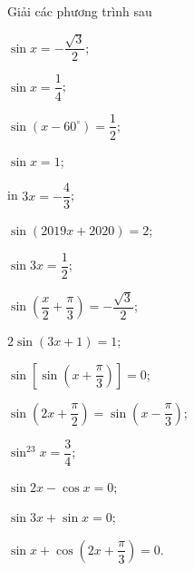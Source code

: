 \begin{ex}%
	Giải  các phương trình sau
	\begin{listEX}[3]
		 \item $\sin x=-\dfrac{\sqrt{3}}{2}$;
		\item  $\sin x=\dfrac{1}{4}$;
		\item $\sin \left(x-60^\circ\right)=\dfrac{1}{2}$; 
		\item  $\sin x=1$;
		\item in  $3x=-\dfrac{4}{3}$;
		\item $\sin  (2019x+2020)=2$;
		\item  $\sin 3x=\dfrac{1}{2}$;
		\item $\sin  \left(\dfrac{x}{2}+\dfrac{\pi}{3}\right)=-\dfrac{\sqrt{3}}{2}$;
		 \item $2\sin (3x+1)=1$;
		\item  $\sin \left[\sin \left(x+\dfrac{\pi}{3}\right)\right]=0$;
		\item $\sin  \left(2x+\dfrac{\pi}{2}\right)=\sin \left(x-\dfrac{\pi}{3}\right)$;
		\item  $\sin^23x=\dfrac{3}{4}$;
		\item $\sin 2x-\cos x=0$; 
		\item $\sin  3x+\sin x=0$;
		\item  $\sin x+\cos \left(2x+\dfrac{\pi}{3}\right)=0$.
	\end{listEX}
\end{ex}
